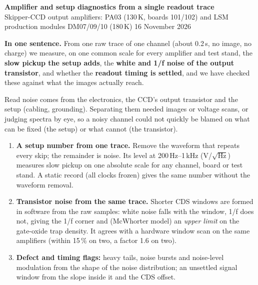 \documentclass[10pt]{article}
\newcommand{\head}[1]{\par\smallskip{\color{acc}\large\bfseries #1}\par\vspace{1pt}}
\newcommand{\key}[1]{\par\colorbox{boxbg}{\parbox{\dimexpr\linewidth-2\fboxsep}{#1}}\par}
\begin{document}
{\color{acc}\LARGE\bfseries Amplifier and setup diagnostics from a single readout trace}\\[2pt]
{\small Skipper-CCD output amplifiers: PA03 (130\,K, boards 101/102) and LSM production modules DM07/09/10 (180\,K) \hfill 16 November 2026}

\key{\textbf{In one sentence.} From one raw trace of one channel (about 0.2\,s, no image, no charge) we measure, on one
common scale for every amplifier and test stand, the \textbf{slow pickup the setup adds}, the \textbf{white and 1/f
noise of the output transistor}, and whether the \textbf{readout timing is settled}, and we have checked these against
what the images actually reach.}

\head{The problem}
Read noise comes from the electronics, the CCD's output transistor and the setup (cabling, grounding). Separating them
needed images or voltage scans, or judging spectra by eye, so a noisy channel could not quickly be blamed on what can be
fixed (the setup) or what cannot (the transistor).

\head{What is new}
\begin{enumerate}
\item \textbf{A setup number from one trace.} Remove the waveform that repeats every skip; the remainder is noise. Its
  level at 200\,Hz--1\,kHz (\textmu V/$\sqrt{\text{Hz}}$) measures slow pickup on one absolute scale for any channel,
  board or test stand. A static record (all clocks frozen) gives the same number without the waveform removal.
\item \textbf{Transistor noise from the same trace.} Shorter CDS windows are formed in software from the raw samples:
  white noise falls with the window, 1/f does not, giving the 1/f corner and (McWhorter model) an \emph{upper limit} on
  the gate-oxide trap density. It agrees with a hardware window scan on the same amplifiers (within 15\,\% on two, a
  factor 1.6 on two).
\item \textbf{Defect and timing flags:} heavy tails, noise bursts and noise-level modulation from the shape of the noise distribution; an unsettled signal
  window from the slope inside it and the CDS offset.
\end{enumerate}
\end{document}
